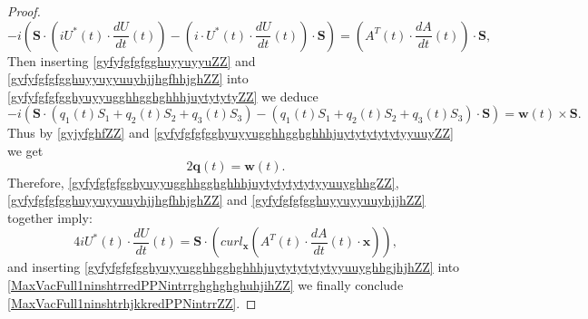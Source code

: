\documentclass{article}
\theoremstyle{definition}
\theoremstyle{remark}
\renewcommand{\vec}[1]{\mathbf{#1}}
\newcommand{\er}{\eqref}
\newcommand{\er}{\eqref}
\begin{document}
\begin{proof}
\begin{equation}
-i\left(\vec S\cdot \left(iU^*(t)\cdot
\frac{dU}{dt}(t)\right)-\left(i\cdot
U^*(t)\cdot\frac{dU}{dt}(t)\right)\cdot \vec
S\right)=\left(A^T(t)\cdot\frac{dA}{dt}(t)\right)\cdot\vec S,
\end{equation}
Then inserting \er{gyfyfgfgfgghuyyuyyuZZ} and
\er{gyfyfgfgfgghuyyuyyuuyhjjhgfhhjghZZ} into
\er{gyfyfgfgfgghyuyyugghhgghghhhjuytytytyZZ} we deduce
\begin{equation}\label{gyfyfgfgfgghyuyyugghhgghghhhjuytytytytytyyuuyZZ}
-i\left(\vec S\cdot
\left(q_1(t)S_1+q_2(t)S_2+q_3(t)S_3\right)-\left(q_1(t)S_1+q_2(t)S_2+q_3(t)S_3\right)\cdot
\vec S\right)=\vec w(t)\times\vec S.
\end{equation}
Thus by \er{gyjyfghfZZ} and
\er{gyfyfgfgfgghyuyyugghhgghghhhjuytytytytytyyuuyZZ} we get
\begin{equation}\label{gyfyfgfgfgghyuyyugghhgghghhhjuytytytytytyyuuyghhgZZ}
2\vec q(t)=\vec w(t).
\end{equation}
Therefore, \er{gyfyfgfgfgghyuyyugghhgghghhhjuytytytytytyyuuyghhgZZ},
\er{gyfyfgfgfgghuyyuyyuuyhjjhgfhhjghZZ} and
\er{gyfyfgfgfgghuyyuyyuuyhjjhZZ} together imply:
\begin{equation}\label{gyfyfgfgfgghyuyyugghhgghghhhjuytytytytytyyuuyghhgjhjhZZ}
4iU^*(t)\cdot\frac{dU}{dt}(t)=\vec S\cdot \left(curl_{\vec
x}\left(A^T(t)\cdot\frac{dA}{dt}(t)\cdot \vec x\right)\right),
\end{equation}
and inserting
\er{gyfyfgfgfgghyuyyugghhgghghhhjuytytytytytyyuuyghhgjhjhZZ} into
\er{MaxVacFull1ninshtrredPPNintrrghghghghuhjihZZ} we finally
conclude \er{MaxVacFull1ninshtrhjkkredPPNintrrZZ}.
\end{proof}
\end{document}
